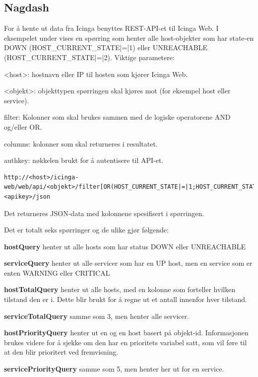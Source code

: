 \subsection{Nagdash}
For å hente ut data fra Icinga benyttes REST-API-et til Icinga Web. I eksempelet under vises en spørring som henter alle host-objekter som har state-en DOWN (HOST\_CURRENT\_STATE|=|1) eller UNREACHABLE (HOST\_CURRENT\_STATE|=|2). Viktige parametere:
\begin{itemize*}
	\item <host>: hostnavn eller IP til hosten som kjører Icinga Web.
	\item <objekt>: objekttypen spørringen skal kjøres mot (for eksempel host eller service).
	\item filter: Kolonner som skal brukes sammen med de logiske operatorene AND og/eller OR.
	\item columns: kolonner som skal returneres i resultatet.
	\item authkey: nøkkelen brukt for å autentisere til API-et.
\end{itemize*}

\begin{lstlisting}[style=example]
http://<host>/icinga-web/web/api/<objekt>/filter[OR(HOST_CURRENT_STATE|=|1;HOST_CURRENT_STATE|=|2)]/columns[HOST_ID|HOST_CURRENT_CHECK_ATTEMPT|...]/authkey=<apikey>/json
\end{lstlisting}
Det returneres JSON-data med kolonnene spesifisert i spørringen.

Det er totalt seks spørringer og de ulike gjør følgende:
\begin{enumerate*}\label{sporringer}
	\item  \textbf{hostQuery} henter ut alle hosts som har status DOWN eller UNREACHABLE
	\item  \textbf{serviceQuery} henter ut alle servicer som har en UP host, men en service som er enten WARNING eller CRITICAL
	\item  \textbf{hostTotalQuery} henter ut alle hosts, med en kolonne som forteller hvilken tilstand den er i. Dette blir brukt for å regne ut et antall innenfor hver tilstand.
	\item  \textbf{serviceTotalQuery} samme som 3, men henter alle servicer.
	\item  \textbf{hostPriorityQuery} henter ut en og en host basert på objekt-id. Informasjonen brukes videre for å sjekke om den har en prioritets variabel satt, som vil føre til at den blir prioritert ved fremvisning.
	\item  \textbf{servicePriorityQuery} samme som 5, men henter her ut for en service.
\end{enumerate*}

